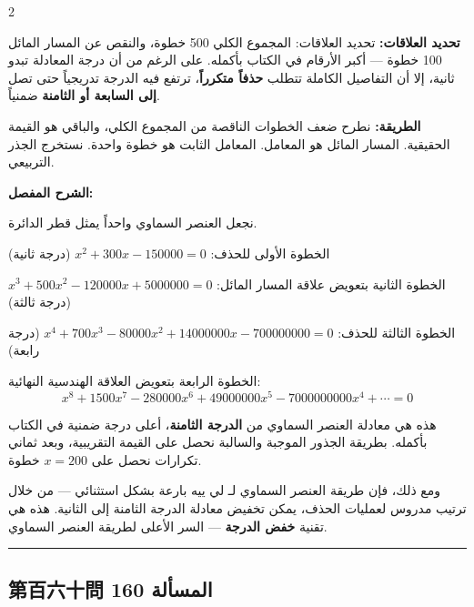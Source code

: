 \documentclass[11pt,a4paper]{article}
\newcommand{\ar}[1]{\arabicfont\beginR #1\endR}
\newcommand{\arb}[1]{\textbf{\arabicfont\beginR #1\endR}}
\newcommand{\longline}{\noindent\rule{\textwidth}{0.4pt}}
\newcommand{\arnote}[1]{\textcolor{arabicblue}{\ar{#1}}}
\newcommand{\arqwd}[1]{\par\noindent\arb{الطريقة: }\arnote{#1}\par}
\newcommand{\arshr}[1]{\par\noindent\arb{الشرح المفصل: }\arnote{#1}\par}
\newcommand{\arfl}[1]{\par\noindent\arb{تحديد العلاقات: }\arnote{#1}\par}
\begin{document}
\begin{paracol}{2}
\begin{rightcolumn}
\arfl{تحديد العلاقات: المجموع الكلي 500 خطوة، والنقص عن المسار المائل 100 خطوة — أكبر الأرقام في الكتاب بأكمله. على الرغم من أن درجة المعادلة تبدو ثانية، إلا أن التفاصيل الكاملة تتطلب \textbf{حذفاً متكرراً}، ترتفع فيه الدرجة تدريجياً حتى تصل \textbf{إلى السابعة أو الثامنة} ضمنياً.}

\arqwd{نطرح ضعف الخطوات الناقصة من المجموع الكلي، والباقي هو القيمة الحقيقية. المسار المائل هو المعامل. المعامل الثابت هو خطوة واحدة. نستخرج الجذر التربيعي.}

\arshr{نجعل العنصر السماوي واحداً يمثل قطر الدائرة.

الخطوة الأولى للحذف: $x^2 + 300x - 150000 = 0$ (درجة ثانية)

الخطوة الثانية بتعويض علاقة المسار المائل: $x^3 + 500x^2 - 120000x + 5000000 = 0$ (درجة ثالثة)

الخطوة الثالثة للحذف: $x^4 + 700x^3 - 80000x^2 + 14000000x - 700000000 = 0$ (درجة رابعة)

الخطوة الرابعة بتعويض العلاقة الهندسية النهائية:
$$x^8 + 1500x^7 - 280000x^6 + 49000000x^5 - 7000000000x^4 + \cdots = 0$$

هذه هي معادلة العنصر السماوي من \textbf{الدرجة الثامنة}، أعلى درجة ضمنية في الكتاب بأكمله. بطريقة الجذور الموجبة والسالبة نحصل على القيمة التقريبية، وبعد ثماني تكرارات نحصل على $x = 200$ خطوة.

ومع ذلك، فإن طريقة العنصر السماوي لـ لي ييه بارعة بشكل استثنائي — من خلال ترتيب مدروس لعمليات الحذف، يمكن تخفيض معادلة الدرجة الثامنة إلى الثانية. هذه هي تقنية \textbf{خفض الدرجة} — السر الأعلى لطريقة العنصر السماوي.}
\end{rightcolumn}

\end{paracol}

\vspace{0.3cm}
\longline

\subsection*{第百六十問 \hfill \ar{المسألة 160}}
\end{document}
